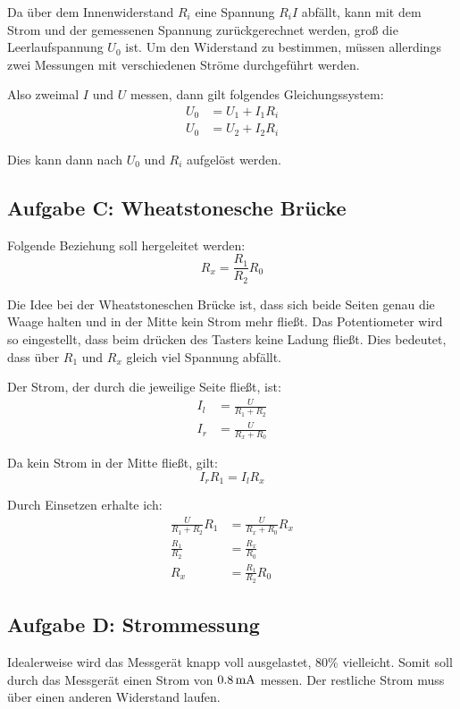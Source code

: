 \documentclass[11pt,german]{article}
\begin{document}
Da über dem Innenwiderstand $R_i$ eine Spannung $R_i I$ abfällt, kann
mit dem Strom und der gemessenen Spannung zurückgerechnet werden, groß
die Leerlaufspannung $U_0$ ist. Um den Widerstand zu bestimmen, müssen
allerdings zwei Messungen mit verschiedenen Ströme durchgeführt werden.

Also zweimal $I$ und $U$ messen, dann gilt folgendes Gleichungssystem:
\begin{align*}
	U_0 &= U_1 + I_1 R_i \\
	U_0 &= U_2 + I_2 R_i
\end{align*}

Dies kann dann nach $U_0$ und $R_i$ aufgelöst werden.

\subsection{Aufgabe C: Wheatstonesche Brücke}

Folgende Beziehung soll hergeleitet werden:
\[ R_x = \frac{R_1}{R_2} R_0 \]

Die Idee bei der Wheatstoneschen Brücke ist, dass sich beide Seiten
genau die Waage halten und in der Mitte kein Strom mehr fließt. Das
Potentiometer wird so eingestellt, dass beim drücken des Tasters keine
Ladung fließt. Dies bedeutet, dass über $R_1$ und $R_x$ gleich viel
Spannung abfällt.

Der Strom, der durch die jeweilige Seite fließt, ist:
\begin{align*}
	I_l &= \frac U{R_1 + R_2} \\
	I_r &= \frac U{R_x + R_0}
\end{align*}

Da kein Strom in der Mitte fließt, gilt:
\[ I_r R_1 = I_l R_x \]

Durch Einsetzen erhalte ich:
\begin{align*}
	\frac U{R_1 + R_2} R_1 &= \frac U{R_x + R_0} R_x \\
	\frac {R_1}{R_2}  &= \frac {R_x}{R_0} \\
	R_x &= \frac {R_1}{R_2} R_0
\end{align*}

\subsection{Aufgabe D: Strommessung}

Idealerweise wird das Messgerät knapp voll ausgelastet, 80\% vielleicht.  Somit
soll durch das Messgerät einen Strom von $\unit[0.8]{mA}$ messen. Der restliche
Strom muss über einen anderen Widerstand laufen.
\end{document}
